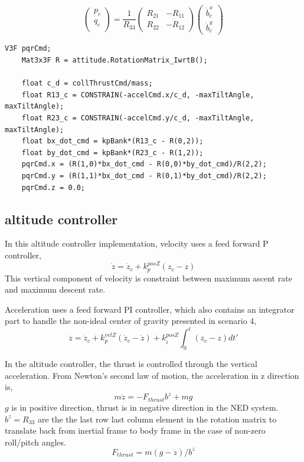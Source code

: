\documentclass[letterpaper]{article}
\begin{document}
$$
\begin{pmatrix} p_c \\ q_c \\ \end{pmatrix}  = \frac{1}{R_{33}}\begin{pmatrix} R_{21} & -R_{11} \\ R_{22} & -R_{12} \end{pmatrix} \begin{pmatrix} \dot{b}^x_c \\ \dot{b}^y_c  \end{pmatrix} 
$$

\begin{lstlisting}[frame=single]
    V3F pqrCmd;
    Mat3x3F R = attitude.RotationMatrix_IwrtB();
    
    float c_d = collThrustCmd/mass;
    float R13_c = CONSTRAIN(-accelCmd.x/c_d, -maxTiltAngle, maxTiltAngle);
    float R23_c = CONSTRAIN(-accelCmd.y/c_d, -maxTiltAngle, maxTiltAngle);
    float bx_dot_cmd = kpBank*(R13_c - R(0,2));
    float by_dot_cmd = kpBank*(R23_c - R(1,2));
    pqrCmd.x = (R(1,0)*bx_dot_cmd - R(0,0)*by_dot_cmd)/R(2,2);
    pqrCmd.y = (R(1,1)*bx_dot_cmd - R(0,1)*by_dot_cmd)/R(2,2);
    pqrCmd.z = 0.0;
\end{lstlisting}

\subsection{altitude controller} \label{control:altitude}

In this altitude controller implementation, velocity uses a feed forward P controller,
$$\dot{z} = \dot{z}_c  + k_{p}^{posZ}(z_{c} - z) $$
This vertical component of velocity is constraint between maximum ascent rate and maximum descent rate.

Acceleration uses a feed forward PI controller, which also contains an integrator part to handle the non-ideal center of gravity presented in scenario 4,
$$\ddot{z} = \ddot{z}_c + k_{p}^{velZ}(\dot{z}_{c} - \dot{z}) + k_i^{posZ}\int_0^t(z_{c} - z)dt'$$ 

In the altitude controller, the thrust is controlled through the vertical acceleration. From Newton's second law of motion, the acceleration in z direction is,
$$ m \ddot{z} = - F_{thrust} b^z + m g$$
$g$ is in positive direction, thrust is in negative direction in the NED system. $b^z = R_{33}$ are the the last row last column element in the rotation matrix to translate back from inertial frame to body frame in the case of non-zero roll/pitch angles.
$$ F_{thrust} = m (g - \ddot{z})/b^z$$ 
\end{document}
